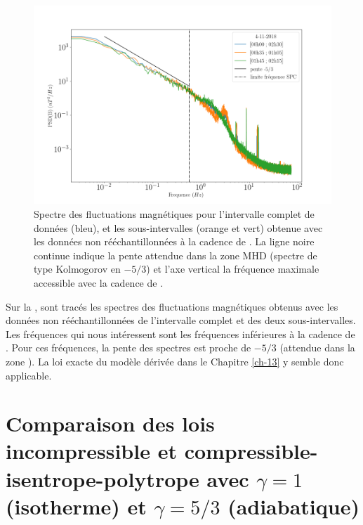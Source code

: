 \begin{figure}[!ht]
 \centering
\includegraphics[width=\linewidth,trim=0cm 0cm 0cm 0cm, clip=false]{./Mainmatter/Part_1/images/Fourier2}
\cprotect\caption{Spectre des fluctuations magnétiques pour l'intervalle complet de données (bleu), et les sous-intervalles (orange et vert) obtenue avec les données  non rééchantillonnées à la cadence de . La ligne noire continue indique la pente attendue dans la zone MHD (spectre de type Kolmogorov en $-5/3$) et l'axe vertical la fréquence maximale accessible avec la cadence de .}
\label{fig:spec_PSP}
\end{figure}

Sur la , sont tracés les spectres des fluctuations magnétiques obtenus avec les données  non rééchantillonnées de l'intervalle complet et des deux sous-intervalles. Les fréquences qui nous intéressent sont les fréquences inférieures à la cadence de . Pour ces fréquences, la pente des spectres est proche de $-5/3$ (attendue dans la zone ). La loi exacte du modèle  dérivée dans le Chapitre \ref{ch-13} y semble donc applicable. 
 
 \section{Comparaison des lois incompressible et compressible-isentrope-polytrope avec \ensuremath{\gamma = 1} (isotherme) et \ensuremath{\gamma = 5/3} (adiabatique)}
 \label{sec-142}

